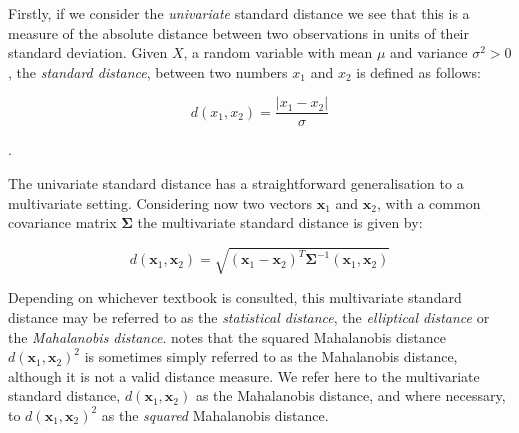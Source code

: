 Firstly, if we consider the \emph{univariate} standard distance we see that this is a measure of the absolute distance between two observations in units of their standard deviation.
Given $X$, a random variable with mean $\mu$ and variance $\sigma^{2} > 0$, the \emph{standard distance}, between two numbers $x_{1}$ and $x_{2}$ is defined as follows:

\begin{displaymath}
d(x_{1}, x_{2}) = \frac{|x_{1} - x_{2}|}{\sigma}
\end{displaymath}

.

The univariate standard distance has a straightforward generalisation to a multivariate setting.   Considering now two vectors  $\boldsymbol{x}_{1}$ and $\boldsymbol{x}_{2}$, with a common covariance matrix $\boldsymbol{\Sigma}$ the multivariate standard distance is given by:

\begin{displaymath}
d(\boldsymbol{x}_{1},\boldsymbol{x}_{2}) = \sqrt{(\boldsymbol{x}_{1} - \boldsymbol{x}_{2})^{T}\boldsymbol{\Sigma}^{-1}(\boldsymbol{x}_{1},\boldsymbol{x}_{2}) }
\end{displaymath}

Depending on whichever textbook is consulted, this multivariate standard distance may be referred to as the \emph{statistical distance}, the \emph{elliptical distance} or the \emph{Mahalanobis distance}.   \cite{Flury:1997} notes that the squared Mahalanobis distance $d(\boldsymbol{x}_{1},\boldsymbol{x}_{2})^{2}$ is sometimes simply referred to as the Mahalanobis distance, although it is not a valid distance measure.   We refer here to the multivariate standard distance,  $d(\boldsymbol{x}_{1},\boldsymbol{x}_{2})$ as the Mahalanobis distance, and where necessary, to  $d(\boldsymbol{x}_{1},\boldsymbol{x}_{2})^{2}$ as the \emph{squared} Mahalanobis distance.


